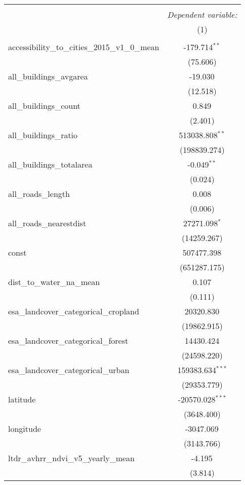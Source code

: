 \begin{table}[!htbp] \centering
\begin{tabular}{@{\extracolsep{5pt}}lc}
\\[-1.8ex]\hline
\hline \\[-1.8ex]
& \multicolumn{1}{c}{\textit{Dependent variable:}} \
\cr \cline{1-2}
\\[-1.8ex] & (1) \\
\hline \\[-1.8ex]
 accessibility_to_cities_2015_v1_0_mean & -179.714$^{**}$ \\
  & (75.606) \\
 all_buildings_avgarea & -19.030$^{}$ \\
  & (12.518) \\
 all_buildings_count & 0.849$^{}$ \\
  & (2.401) \\
 all_buildings_ratio & 513038.808$^{**}$ \\
  & (198839.274) \\
 all_buildings_totalarea & -0.049$^{**}$ \\
  & (0.024) \\
 all_roads_length & 0.008$^{}$ \\
  & (0.006) \\
 all_roads_nearestdist & 27271.098$^{*}$ \\
  & (14259.267) \\
 const & 507477.398$^{}$ \\
  & (651287.175) \\
 dist_to_water_na_mean & 0.107$^{}$ \\
  & (0.111) \\
 esa_landcover_categorical_cropland & 20320.830$^{}$ \\
  & (19862.915) \\
 esa_landcover_categorical_forest & 14430.424$^{}$ \\
  & (24598.220) \\
 esa_landcover_categorical_urban & 159383.634$^{***}$ \\
  & (29353.779) \\
 latitude & -20570.028$^{***}$ \\
  & (3648.400) \\
 longitude & -3047.069$^{}$ \\
  & (3143.766) \\
 ltdr_avhrr_ndvi_v5_yearly_mean & -4.195$^{}$ \\
  & (3.814) \\

\end{tabular}
\end{table}
